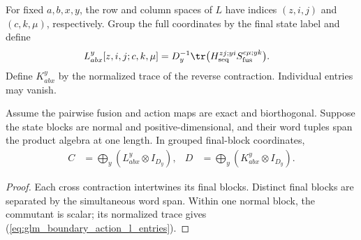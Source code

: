\begin{definition}
    \leanok
    \label{def:glm_boundary_action_l_matrix}
    For fixed $a,b,x,y$, the row and column spaces of $L$ have indices
    $(z,i,j)$ and $(c,k,\mu)$, respectively. Group the full coordinates
    by the final state label and define
    \begin{align}
        L_{abx}^{y}[z,i,j;c,k,\mu]
         & =D_y^{-1}\tr\bigl(H_{\rm seq}^{zj;yi}S_{\rm fus}^{c\mu;yk}\bigr).
        \label{eq:glm_boundary_action_l_entries}
    \end{align}
    Define $K_{abx}^y$ by the normalized trace of the reverse contraction.
    Individual entries may vanish.
\end{definition}

\begin{lemma}
    \leanok
    \label{thm:glm_boundary_action_l_factor}
    Assume the pairwise fusion and action maps are exact and biorthogonal.
    Suppose the state blocks are normal and positive-dimensional, and
    their word tuples span the product algebra at one length. In grouped
    final-block coordinates,
    \begin{align}
        C & =\bigoplus_y(L_{abx}^y\otimes I_{D_y}), &
        D & =\bigoplus_y(K_{abx}^y\otimes I_{D_y}).
        \label{eq:glm_boundary_action_l_factor}
    \end{align}
\end{lemma}
\begin{proof}
    \leanok
    Each cross contraction intertwines its final blocks. Distinct final
    blocks are separated by the simultaneous word span. Within one normal
    block, the commutant is scalar; its normalized trace gives
    (\ref{eq:glm_boundary_action_l_entries}).
\end{proof}

